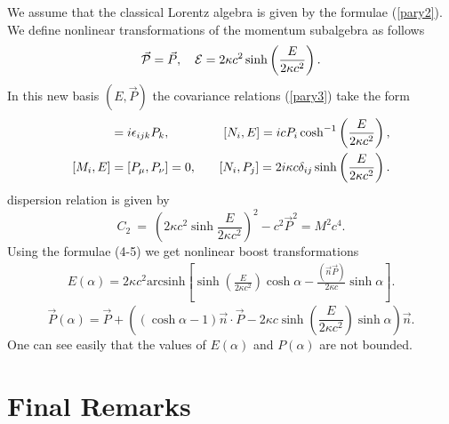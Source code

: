 \documentclass[a4paper,12pt]{article} \usepackage{times}
\begin{document}
We assume that the classical Lorentz algebra is given by the
formulae (\ref{pary2}). We define nonlinear transformations of the
momentum subalgebra as follows
\begin{equation}
\vec{\cal{P}}  =  \vec{P} ,\quad {\cal{E}} =  2\kappa c^2
\sinh\left(\frac{E}{2\kappa c^2}\right) .
\end{equation}
In this new basis $(E, \vec{P})$ the covariance relations (\ref{pary3})
take the form \begin{eqnarray} [M_i, P_j]& =  i\epsilon_{ijk} P_k , 
\quad
&[N_i, E ]  =  i c P_i \cosh^{-1}\left(\frac{E}{2\kappa c^2}\right) ,\cr
[M_i,E]& = [P_\mu, P_\nu] = 0  , \quad &[N_i,P_j]  = 2i \kappa c
\delta_{ij} \sinh\left(\frac{E}{2 \kappa c^2}\right) . \end{eqnarray}
 dispersion relation is given by
\begin{equation}
C_2 \ = \ \left(2\kappa c^2\sinh \frac{E}{2\kappa c^2} \right)^2 -
c^2\vec P^2 = M^2 c^4 .
\end{equation}
Using the formulae (4-5) we get nonlinear  boost transformations
\begin{eqnarray}
E(\alpha) = 2\kappa c^2\mbox{arcsinh}
\left[\sinh\left(\frac{E}{2\kappa c^2}\right)\cosh \alpha -
\frac{(\vec{n}\vec{P})}{2\kappa c} \sinh \alpha\right].
\end{eqnarray}
\begin{equation}
\vec{P}(\alpha)  =  \vec{P} +
\left((\cosh\alpha-1)\vec{n}\cdot\vec{P} - 2\kappa c \sinh
\left(\frac{E}{2\kappa c^2}\right) \sinh\alpha\right)\vec{n} .
\end{equation}
One can see easily  that the values of $E(\alpha)$ and $P(\alpha)$
are not bounded.

\section{Final Remarks}
\end{document}
